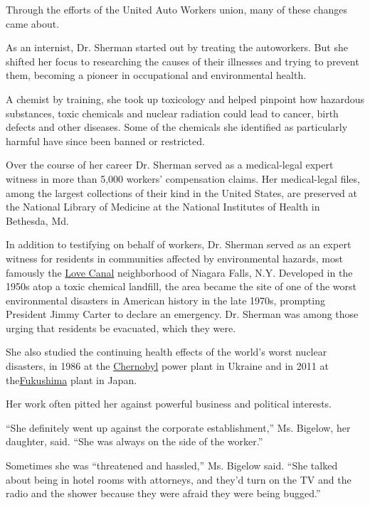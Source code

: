 Through the efforts of the United Auto Workers union, many of these
changes came about.

As an internist, Dr. Sherman started out by treating the autoworkers.
But she shifted her focus to researching the causes of their illnesses
and trying to prevent them, becoming a pioneer in occupational and
environmental health.

A chemist by training, she took up toxicology and helped pinpoint how
hazardous substances, toxic chemicals and nuclear radiation could lead
to cancer, birth defects and other diseases. Some of the chemicals she
identified as particularly harmful have since been banned or restricted.

Over the course of her career Dr. Sherman served as a medical-legal
expert witness in more than 5,000 workers' compensation claims. Her
medical-legal files, among the largest collections of their kind in the
United States, are preserved at the National Library of Medicine at the
National Institutes of Health in Bethesda, Md.

In addition to testifying on behalf of workers, Dr. Sherman served as an
expert witness for residents in communities affected by environmental
hazards, most famously the
\href{https://www.nytimes3xbfgragh.onion/1984/10/30/nyregion/love-canal-a-look-back.html}{Love
Canal} neighborhood of Niagara Falls, N.Y. Developed in the 1950s atop a
toxic chemical landfill, the area became the site of one of the worst
environmental disasters in American history in the late 1970s, prompting
President Jimmy Carter to declare an emergency. Dr. Sherman was among
those urging that residents be evacuated, which they were.

She also studied the continuing health effects of the world's worst
nuclear disasters, in 1986 at the
\href{https://www.nytimes3xbfgragh.onion/2019/02/06/books/review-midnight-chernobyl-adam-higginbotham.html}{Chernobyl}
power plant in Ukraine and in 2011 at
the\href{https://www.britannica.com/event/Fukushima-accident}{Fukushima}
plant in Japan.

Her work often pitted her against powerful business and political
interests.

``She definitely went up against the corporate establishment,'' Ms.
Bigelow, her daughter, said. ``She was always on the side of the
worker.''

Sometimes she was ``threatened and hassled,'' Ms. Bigelow said. ``She
talked about being in hotel rooms with attorneys, and they'd turn on the
TV and the radio and the shower because they were afraid they were being
bugged.''

